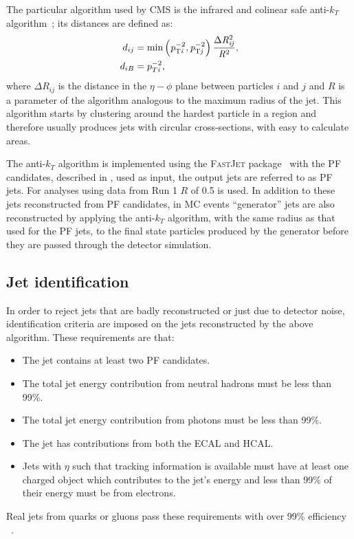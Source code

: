 The particular algorithm used by CMS is the infrared and colinear safe anti-$k_{T}$ algorithm~\cite{1126-6708-2008-04-063}; its distances are defined as:
\begin{align}
d_{ij}&=\rm{min}\left(\mathit{p}_{\mathrm{T}\mathit{i}}^{-2},\mathit{p}_{\mathrm{T}\mathit{j}}^{-2}\right)\frac{\Delta \mathit{R}_{\mathit{ij}}^{2}}{\mathit{R}^{2}},\\
d_{iB}&=p_{T\mathit{i}}^{-2},
\end{align}
where $\Delta R_{ij}$ is the distance in the $\eta-\phi$ plane between particles $i$ and $j$ and $R$ is a parameter of the algorithm analogous to the maximum radius of the jet. This algorithm starts by clustering around the hardest particle in a region and therefore usually produces jets with circular cross-sections, with easy to calculate areas.

The anti-$k_{T}$ algorithm is implemented using the \textsc{FastJet} package~\cite{Cacciari:fastjet1} with the \ac{PF} candidates, described in , used as input, the output jets are referred to as \ac{PF} jets. For analyses using data from \LHC Run 1 $R$ of 0.5 is used. In addition to these jets reconstructed from \ac{PF} candidates, in \ac{MC} events ``generator'' jets are also reconstructed by applying the anti-$k_{T}$ algorithm, with the same radius as that used for the \ac{PF} jets, to the final state particles produced by the generator before they are passed through the detector simulation.

\subsection{Jet identification}
\label{sec:jetid}
In order to reject jets that are badly reconstructed or just due to detector noise, identification criteria are imposed on the jets reconstructed by the above algorithm. These requirements are that:
\begin{itemize}
\item The jet contains at least two \ac{PF} candidates.
\item The total jet energy contribution from neutral hadrons must be less than 99\%.
\item The total jet energy contribution from photons must be less than 99\%.
\item The jet has contributions from both the \ac{ECAL} and \ac{HCAL}.
\item Jets with $\eta$ such that tracking information is available must have at least one charged object which contributes to the jet's energy and less than 99\% of their energy must be from electrons.
\end{itemize}
Real jets from quarks or gluons pass these requirements with over 99\% efficiency ~\cite{ARTICLE:CMSAN-14-227}.


